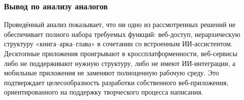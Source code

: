 \subsubsection{Вывод по анализу аналогов}

Проведённый анализ показывает, что ни одно из рассмотренных решений не обеспечивает полного набора требуемых функций: веб-доступ, иерархическую структуру «книга--арка--глава» в сочетании со встроенным ИИ-ассистентом. Десктопные приложения проигрывают в кроссплатформенности, веб-сервисы либо не поддерживают нужную структуру, либо не имеют ИИ-интеграции, а мобильные приложения не заменяют полноценную рабочую среду. Это подтверждает целесообразность разработки собственного веб-приложения, ориентированного на поддержку творческого процесса написания.
